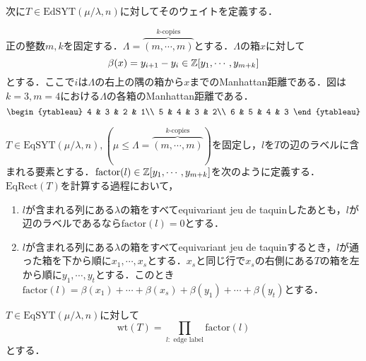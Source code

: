 \begin{eg}
\begin{center}
  \end{center}
\end{eg}

次に$T\in\text{EdSYT}(\mu/\lambda, n)$に対してそのウェイトを定義する．

\begin{defin}
  正の整数$m, k$を固定する．$\Lambda=\overbrace{(m,\cdots,m)}^{k\text{-copies}}$とする．$\Lambda$の箱$x$に対して
  \[
  \beta(x)=y_{i+1}-y_i\in \mathbb{Z}[y_1,\cdots,y_{m+k}]
  \]
  とする．ここで$i$は$\Lambda$の右上の隅の箱から$x$までのManhattan距離である．図は$k=3,m=4$における$\Lambda$の各箱のManhattan距離である．
  \[
  \begin{ytableau}
    4 & 3 & 2 & 1\\
    5 & 4 & 3 & 2\\
    6 & 5 & 4 & 3
  \end{ytableau}
  \]
\end{defin}

\begin{defin}
  $T\in\text{EqSYT}(\mu/\lambda, n), (\mu\leq\Lambda=\overbrace{(m,\cdots,m)}^{k\text{-copies}})$を固定し，$l$を$T$の辺のラベルに含まれる要素とする．$\text{factor}(l)\in\mathbb{Z}[y_1,\cdots,y_{m+k}]$を次のように定義する．$\text{EqRect}(T)$を計算する過程において，
  \begin{enumerate}
    \item $l$が含まれる列にある$\lambda$の箱をすべてequivariant jeu de taquinしたあとも，$l$が辺のラベルであるなら$\text{factor}(l)=0$とする．
    \item $l$が含まれる列にある$\lambda$の箱をすべてequivariant jeu de taquinするとき，$l$が通った箱を下から順に$x_1,\cdots,x_s$とする．$x_s$と同じ行で$x_s$の右側にある$T$の箱を左から順に$y_1,\cdots,y_t$とする．このとき$\text{factor}(l)=\beta(x_1)+\cdots+\beta(x_s)+\beta(y_1)+\cdots+\beta(y_t)$とする．
  \end{enumerate}
\end{defin}

\begin{defin}
  $T\in\text{EqSYT}(\mu/\lambda, n)$に対して
  \[
  \text{wt}(T)=\prod_{l:\text{ edge label}}\text{factor}(l)
  \]
  とする．
\end{defin}

